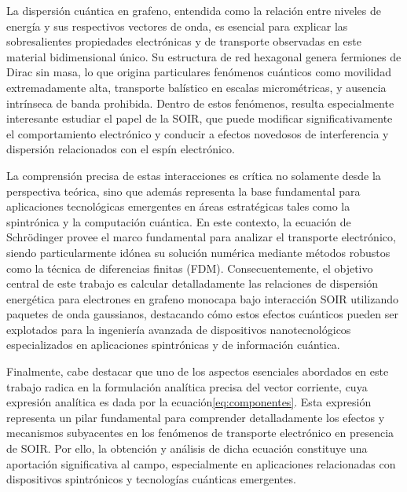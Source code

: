 La dispersión cuántica en grafeno, entendida como la relación entre niveles de energía y sus respectivos vectores de onda, es esencial para explicar las sobresalientes propiedades electrónicas y de transporte observadas en este material bidimensional único.
Su estructura de red hexagonal genera fermiones de Dirac sin masa, lo que origina particulares fenómenos cuánticos como movilidad extremadamente alta, transporte balístico en escalas micrométricas, y ausencia intrínseca de banda prohibida\cite{Serna2019}.
Dentro de estos fenómenos, resulta especialmente interesante estudiar el papel de la SOIR, que puede modificar significativamente el comportamiento electrónico y conducir a efectos novedosos de interferencia y dispersión relacionados con el espín electrónico.

La comprensión precisa de estas interacciones es crítica no solamente desde la perspectiva teórica, sino que además representa la base fundamental para aplicaciones tecnológicas emergentes en áreas estratégicas tales como la spintrónica y la computación cuántica\cite{WeizheMaterials2017, AvsarNatCommun2014, LiuNano2023}.
En este contexto, la ecuación de Schrödinger provee el marco fundamental para analizar el transporte electrónico, siendo particularmente idónea su solución numérica mediante métodos robustos como la técnica de diferencias finitas (FDM).
Consecuentemente, el objetivo central de este trabajo es calcular detalladamente las relaciones de dispersión energética para electrones en grafeno monocapa bajo interacción SOIR utilizando paquetes de onda gaussianos, destacando cómo estos efectos cuánticos pueden ser explotados para la ingeniería avanzada de dispositivos nanotecnológicos especializados en aplicaciones spintrónicas y de información cuántica.


Finalmente, cabe destacar que uno de los aspectos esenciales abordados en este trabajo radica en la formulación analítica precisa del vector corriente, cuya expresión analítica es dada por la ecuación\eqref{eq:componentes}.
Esta expresión representa un pilar fundamental para comprender detalladamente los efectos y mecanismos subyacentes en los fenómenos de transporte electrónico en presencia de SOIR\@.
Por ello, la obtención y análisis de dicha ecuación constituye una aportación significativa al campo, especialmente en aplicaciones relacionadas con dispositivos spintrónicos y tecnologías cuánticas emergentes.


